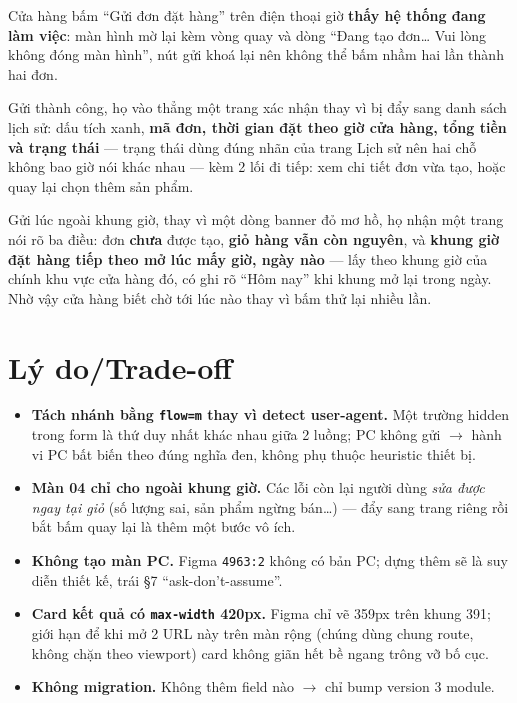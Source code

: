 Cửa hàng bấm ``Gửi đơn đặt hàng'' trên điện thoại giờ \textbf{thấy hệ thống đang làm việc}: màn hình
mờ lại kèm vòng quay và dòng ``Đang tạo đơn\ldots{} Vui lòng không đóng màn hình'', nút gửi khoá lại
nên không thể bấm nhầm hai lần thành hai đơn.

Gửi thành công, họ vào thẳng một trang xác nhận thay vì bị đẩy sang danh sách lịch sử: dấu tích xanh,
\textbf{mã đơn, thời gian đặt theo giờ cửa hàng, tổng tiền và trạng thái} --- trạng thái dùng đúng
nhãn của trang Lịch sử nên hai chỗ không bao giờ nói khác nhau --- kèm 2 lối đi tiếp: xem chi tiết
đơn vừa tạo, hoặc quay lại chọn thêm sản phẩm.

Gửi lúc ngoài khung giờ, thay vì một dòng banner đỏ mơ hồ, họ nhận một trang nói rõ ba điều: đơn
\textbf{chưa} được tạo, \textbf{giỏ hàng vẫn còn nguyên}, và \textbf{khung giờ đặt hàng tiếp theo mở
lúc mấy giờ, ngày nào} --- lấy theo khung giờ của chính khu vực cửa hàng đó, có ghi rõ ``Hôm nay''
khi khung mở lại trong ngày. Nhờ vậy cửa hàng biết chờ tới lúc nào thay vì bấm thử lại nhiều lần.

\section{Lý do/Trade-off}

\begin{itemize}
  \item \textbf{Tách nhánh bằng \texttt{flow=m} thay vì detect user-agent.} Một trường hidden trong
    form là thứ duy nhất khác nhau giữa 2 luồng; PC không gửi $\to$ hành vi PC bất biến theo đúng
    nghĩa đen, không phụ thuộc heuristic thiết bị.
  \item \textbf{Màn 04 chỉ cho ngoài khung giờ.} Các lỗi còn lại người dùng \emph{sửa được ngay tại
    giỏ} (số lượng sai, sản phẩm ngừng bán\ldots) --- đẩy sang trang riêng rồi bắt bấm quay lại là
    thêm một bước vô ích.
  \item \textbf{Không tạo màn PC.} Figma \texttt{4963:2} không có bản PC; dựng thêm sẽ là suy diễn
    thiết kế, trái §7 ``ask-don't-assume''.
  \item \textbf{Card kết quả có \texttt{max-width} 420px.} Figma chỉ vẽ 359px trên khung 391;
    giới hạn để khi mở 2 URL này trên màn rộng (chúng dùng chung route, không chặn theo viewport)
    card không giãn hết bề ngang trông vỡ bố cục.
  \item \textbf{Không migration.} Không thêm field nào $\to$ chỉ bump version 3 module.
\end{itemize}

